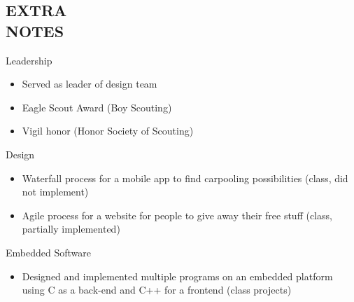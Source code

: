 \documentclass[mm]{res}
\begin{document}
\begin{resume}
\section{EXTRA \\ NOTES}         
            Leadership
		\begin{itemize}
			\item Served as leader of design team
			\item Eagle Scout Award (Boy Scouting)
			\item Vigil honor (Honor Society of Scouting)
		\end{itemize}
	Design
		\begin{itemize}
			\item Waterfall process for a mobile app to find carpooling possibilities (class, did not implement)
			\item Agile process for a website for people to give away their free stuff (class, partially implemented)
		\end{itemize}
	Embedded Software
		\begin{itemize}
			\item Designed and implemented multiple programs on an embedded platform using C as a back-end and C++ for a frontend (class projects)
 		\end{itemize}

\end{resume}
\end{document}
